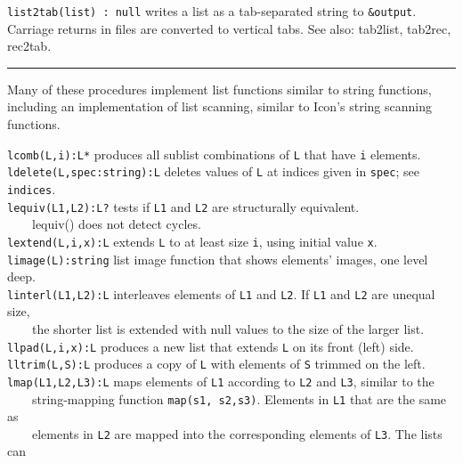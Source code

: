 \texttt{list2tab(list) : null} writes a list as a tab-separated string
to \texttt{\&output}. Carriage returns in files are converted to
vertical tabs.
See also: tab2list, tab2rec, rec2tab. 

\vspace{0.25cm}\hrule{}

Many of these procedures implement list functions
similar to string functions, including an implementation of
list scanning, similar to Icon's
string scanning functions.

\texttt{lcomb(L,i):L*} produces all sublist combinations of \texttt{L}
that have \texttt{i} elements.\\
\texttt{ldelete(L,spec:string):L} deletes values of \texttt{L} at
indices given in \texttt{spec}; see \texttt{indices}.\\
\texttt{lequiv(L1,L2):L?} tests if \texttt{L1} and \texttt{L2} are
structurally equivalent.\\
 \ \ \ \ lequiv() does not detect cycles.\\
\texttt{lextend(L,i,x):L} extends \texttt{L} to at least size
\texttt{i}, using initial value \texttt{x}.\\
\texttt{limage(L):string} list image function that shows
elements' images, one level deep.\\
\texttt{linterl(L1,L2):L} interleaves elements of \texttt{L1} and
\texttt{L2}. If \texttt{L1} and \texttt{L2} are unequal size,\\
 \ \ \ \ the shorter list is extended with null values to the
size of the larger list.\\
\texttt{llpad(L,i,x):L} produces a new list that extends \texttt{L} on
its front (left) side.\\
\texttt{lltrim(L,S):L} produces a copy of \texttt{L} with elements of
\texttt{S} trimmed on the left.\\
\texttt{lmap(L1,L2,L3):L} maps elements of \texttt{L1} according to
\texttt{L2} and \texttt{L3}, similar to the\\
 \ \ \ \ string-mapping function \texttt{map(s1, s2,s3)}. Elements in
\texttt{L1} that are the same as\\
 \ \ \ \  elements in \texttt{L2} are mapped into the corresponding
 elements of \texttt{L3}.  %
The lists can \\
